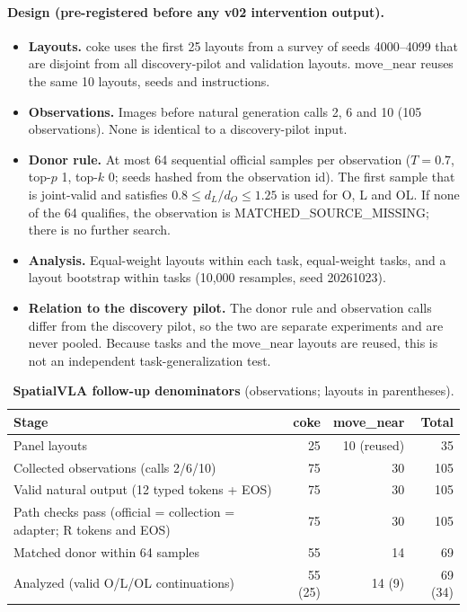 \paragraph{Design (pre-registered before any v02 intervention output).}
\begin{itemize}
\item \textbf{Layouts.} coke uses the first 25 layouts from a survey of seeds 4000--4099 that are disjoint from all discovery-pilot and validation layouts. move\_near reuses the same 10 layouts, seeds and instructions.
\item \textbf{Observations.} Images before natural generation calls 2, 6 and 10 (105 observations). None is identical to a discovery-pilot input.
\item \textbf{Donor rule.} At most 64 sequential official samples per observation ($T{=}0.7$, top-$p$ 1, top-$k$ 0; seeds hashed from the observation id). The first sample that is joint-valid and satisfies $0.8\le d_L/d_O\le1.25$ is used for O, L and OL. If none of the 64 qualifies, the observation is MATCHED\_SOURCE\_MISSING; there is no further search.
\item \textbf{Analysis.} Equal-weight layouts within each task, equal-weight tasks, and a layout bootstrap within tasks (10,000 resamples, seed 20261023).
\item \textbf{Relation to the discovery pilot.} The donor rule and observation calls differ from the discovery pilot, so the two are separate experiments and are never pooled. Because tasks and the move\_near layouts are reused, this is not an independent task-generalization test.
\end{itemize}

\begin{table}[h]
\centering\small
\caption{\textbf{SpatialVLA follow-up denominators} (observations; layouts in parentheses).}
\label{tab:svla2flow}
\begin{tabular}{@{}lrrr@{}}\toprule
Stage & coke & move\_near & Total\\\midrule
Panel layouts & 25 & 10 (reused) & 35\\
Collected observations (calls 2/6/10) & 75 & 30 & 105\\
Valid natural output (12 typed tokens + EOS) & 75 & 30 & 105\\
Path checks pass (official = collection = adapter; R tokens and EOS) & 75 & 30 & 105\\
Matched donor within 64 samples & 55 & 14 & 69\\
Analyzed (valid O/L/OL continuations) & 55 (25) & 14 (9) & 69 (34)\\\bottomrule
\end{tabular}
\end{table}

